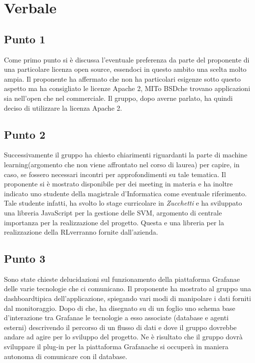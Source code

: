 \section{Verbale}
        \subsection{Punto 1}
            Come primo punto si è discussa l'eventuale preferenza da parte del proponente di una particolare licenza open source, essendoci in questo ambito una scelta molto ampia. Il proponente ha affermato che non ha particolari esigenze sotto questo aspetto ma ha consigliato le licenze Apache 2\glo, MIT\glosp o BSD\glosp che trovano applicazioni sia nell'open che nel commerciale. Il gruppo, dopo averne parlato, ha quindi deciso di utilizzare la licenza Apache 2\glo.
        \subsection{Punto 2}
            Successivamente il gruppo ha chiesto chiarimenti riguardanti la parte di machine learning\glosp (argomento che non viene affrontato nel corso di laurea) per capire, in caso, se fossero necessari incontri per approfondimenti su tale tematica. Il proponente si è mostrato disponibile per dei meeting in materia e ha inoltre indicato uno studente della magistrale d'Informatica come eventuale riferimento. Tale studente infatti, ha svolto lo stage curricolare in \textit{Zucchetti} e ha sviluppato una libreria JavaScript per la gestione delle SVM\glosp, argomento di centrale importanza per la realizzazione del progetto\glo. Questa e una libreria per la realizzazione della RL\glosp verranno fornite dall'azienda.
        \subsection{Punto 3}
            Sono state chieste delucidazioni sul funzionamento della piattaforma Grafana\glosp e delle varie tecnologie che ci comunicano. Il proponente ha mostrato al gruppo una dashboard\glosp tipica dell'applicazione, spiegando vari modi di manipolare i dati forniti dal monitoraggio. Dopo di che, ha disegnato su di un foglio uno schema base d'interazione tra Grafana\glosp e le tecnologie a esso associate (database e agenti esterni) descrivendo il percorso di un flusso di dati e dove il gruppo dovrebbe andare ad agire per lo sviluppo del progetto\glo. Ne è risultato che il gruppo dovrà sviluppare il plug-in per la piattaforma Grafana\glosp che si occuperà in maniera autonoma di comunicare con il database.
